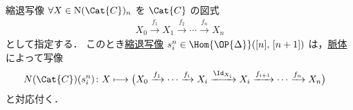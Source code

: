 \documentclass[TQFT_main]{subfiles}
\begin{document}
\begin{myexample}[label=ex:nerve-degen]{縮退写像}
    $\forall X \in \mathrm{N}(\Cat{C})_n$ を $\Cat{C}$ の図式
    \begin{align}
        X_0 \xrightarrow{f_1} X_1 \xrightarrow{f_2} \cdots \xrightarrow{f_n} X_n
    \end{align}
    として指定する．
    このとき\hyperref[def:simplex-cat]{縮退写像} $s^n_i \in \Hom{\OP{\Delta}}([n],\, [n+1])$ は，\hyperref[def:nerve]{脈体}によって写像
    \begin{align}
        N(\Cat{C})(s^n_i)\colon 
        X &\lmto \bigl( X_0 \xrightarrow{f_1} \cdots \xrightarrow{f_{i}} X_{i} \xrightarrow{\Id_{X_i}} X_{i} \xrightarrow{f_{i+1}} \cdots \xrightarrow{f_n} X_{n} \bigr) 
    \end{align}
    と対応付く．
\end{myexample}
\end{document}
